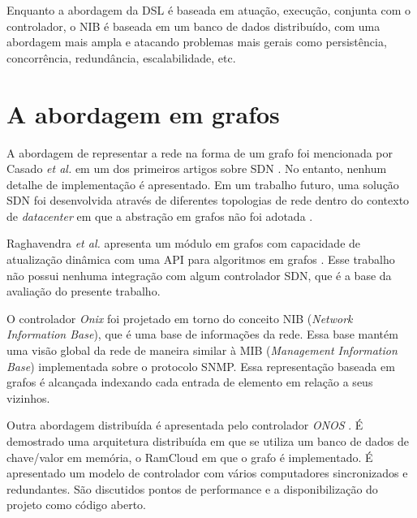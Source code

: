 Enquanto a abordagem da DSL é baseada em atuação, execução,
conjunta com o controlador,
o NIB é baseada em um banco de dados distribuído,
com uma abordagem mais ampla e atacando problemas mais gerais
como persistência, concorrência, redundância, escalabilidade, etc.

\section{A abordagem em grafos}

A abordagem de representar a rede na forma de um grafo foi mencionada
por Casado \emph{et al.} em um dos primeiros artigos sobre SDN
\citep{martin2010virtualizing}.
No entanto, nenhum detalhe de implementação é apresentado.
Em um trabalho futuro, uma solução SDN foi desenvolvida através de
diferentes topologias de rede dentro do contexto de \emph{datacenter}
em que a abstração em grafos não foi adotada \citep{ripcord}.

Raghavendra \emph{et al.} apresenta um módulo em grafos com capacidade
de atualização dinâmica com uma API para algoritmos em grafos
\citep{ramya2012dynamic}.
Esse trabalho não possui nenhuma integração com algum controlador SDN,
que é a base da avaliação do presente trabalho.

O controlador \emph{Onix} \citep{teemu2010onix} foi projetado em torno do
conceito NIB (\emph{Network Information Base}), que é uma base
de informações da rede.
Essa base mantém uma visão global da rede de maneira similar à
MIB (\emph{Management Information Base}) implementada sobre o
protocolo SNMP.
Essa representação baseada em grafos é alcançada indexando cada
entrada de elemento em relação a seus vizinhos.

Outra abordagem distribuída é apresentada pelo controlador \emph{ONOS}
\citep{berde2016onos}.
É demostrado uma arquitetura distribuída em que se
utiliza um banco de dados de chave/valor em memória, o RamCloud
\citep{ousterhout2015ramcloud} em que o grafo é implementado.
É apresentado um modelo de controlador com vários computadores sincronizados
e redundantes.
São discutidos pontos de performance e a disponibilização do projeto como
código aberto.

